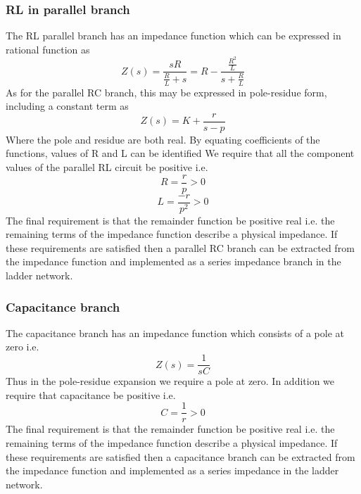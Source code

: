 \subsubsection{RL in parallel branch}

The RL parallel branch has an impedance function which can be expressed in rational function as
\begin{equation} 
Z\left(s\right)=\frac{sR}{\frac{R}{L} + s}=R-\frac{\frac{R^2}{L}}{s+\frac{R}{L}}
\end{equation}
As for the parallel RC branch, this may be expressed in pole-residue form, including a constant term as
\begin{equation} 
Z\left(s\right)= K+\frac{r}{s-p}
\end{equation}
Where the pole and residue are both real. By equating coefficients of the functions, values of R and L can be identified
We require that all the component values of the parallel RL circuit be positive i.e.
\begin{equation} 
R=\frac{r}{p}>0
\end{equation}
\begin{equation} 
L=\frac{-r}{p^2}>0
\end{equation}
The final requirement is that the remainder function be positive real i.e. the remaining terms of the impedance function describe a physical impedance. If these requirements are satisfied then a parallel RC branch can be extracted from the impedance function and implemented as a series impedance branch in the ladder network. 


\subsubsection{Capacitance branch}

The capacitance branch has an impedance function which consists of a pole at zero i.e.
\begin{equation} 
Z\left(s\right)=\frac{1}{sC}
\end{equation}
Thus in the pole-residue expansion we require a pole at zero. In addition we require that capacitance be positive i.e.
\begin{equation} 
C=\frac{1}{r}>0
\end{equation}
The final requirement is that the remainder function be positive real i.e. the remaining terms of the impedance function describe a physical impedance. If these requirements are satisfied then a capacitance branch can be extracted from the impedance function and implemented as a series impedance in the ladder network. 


